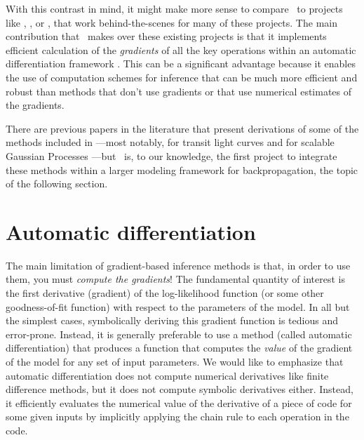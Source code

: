 \documentclass[modern]{aastex62}
\begin{document}
With this contrast in mind, it might make more sense to compare \exoplanet\ to projects like  \citep{Kreidberg:2015},  \citep{Maxted:2016}, or  \citep{Foreman-Mackey:2017}, that work behind-the-scenes for many of these projects.
The main contribution that \exoplanet\ makes over these existing projects is that it implements efficient calculation of the \emph{gradients} of all the key operations within an automatic differentiation framework \citep{Theano-Development-Team:2016}.
This can be a significant advantage because it enables the use of computation schemes for inference that can be much more efficient and robust than methods that don't use gradients or that use numerical estimates of the gradients.

There are previous papers in the literature that present derivations of some of the methods included in \exoplanet---most notably, for transit light curves \citep[,][]{Pal:2008, Luger:2019, Agol:2019} and for scalable Gaussian Processes \citep{Foreman-Mackey:2018a}---but \exoplanet\ is, to our knowledge, the first project to integrate these methods within a larger modeling framework for backpropagation, the topic of the following section.





\section{Automatic differentiation}

The main limitation of gradient-based inference methods is that, in order to
use them, you must \emph{compute the gradients}!
The fundamental quantity of interest is the first derivative (gradient) of the
log-likelihood function (or some other goodness-of-fit function) with respect
to the parameters of the model.
In all but the simplest cases, symbolically deriving this gradient function is
tedious and error-prone.
Instead, it is generally preferable to use a method (called automatic differentiation) that produces a function that computes the \emph{value} of the gradient of the model for any set of input parameters.
We would like to emphasize that automatic differentiation does not compute numerical derivatives like finite difference methods, but it does not compute symbolic derivatives either.
Instead, it efficiently evaluates the numerical value of the derivative of a piece of code for some given inputs by implicitly applying the chain rule to each operation in the code.
\end{document}
